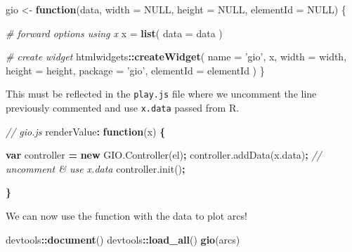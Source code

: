 \documentclass[10pt,]{krantz}
\makeatletter
\newenvironment{Shaded}{\begin{snugshade}}{\end{snugshade}}
\newcommand{\AttributeTok}[1]{\textcolor[rgb]{0.61,0.61,0.61}{#1}}
\newcommand{\CommentTok}[1]{\textcolor[rgb]{0.37,0.37,0.37}{\textit{#1}}}
\newcommand{\ControlFlowTok}[1]{\textcolor[rgb]{0.27,0.27,0.27}{\textbf{#1}}}
\newcommand{\DataTypeTok}[1]{\textcolor[rgb]{0.27,0.27,0.27}{#1}}
\newcommand{\KeywordTok}[1]{\textcolor[rgb]{0.27,0.27,0.27}{\textbf{#1}}}
\newcommand{\NormalTok}[1]{#1}
\newcommand{\OperatorTok}[1]{\textcolor[rgb]{0.43,0.43,0.43}{\textbf{#1}}}
\newcommand{\OtherTok}[1]{\textcolor[rgb]{0.37,0.37,0.37}{#1}}
\newcommand{\StringTok}[1]{\textcolor[rgb]{0.5,0.5,0.5}{#1}}
\newcommand{\VariableTok}[1]{\textcolor[rgb]{0,0,0}{#1}}
\newenvironment{kframe}{%
\medskip{}
\setlength{\fboxsep}{.8em}
 \def\at@end@of@kframe{}%
 \ifinner\ifhmode%
  \def\at@end@of@kframe{\end{minipage}}%
  \begin{minipage}{\columnwidth}%
 \fi\fi%
 \def\FrameCommand##1{\hskip\@totalleftmargin \hskip-\fboxsep
 \colorbox{shadecolor}{##1}\hskip-\fboxsep
     \hskip-\linewidth \hskip-\@totalleftmargin \hskip\columnwidth}%
 \MakeFramed {\advance\hsize-\width
   \@totalleftmargin\z@ \linewidth\hsize
   \@setminipage}}%
 {\par\unskip\endMakeFramed%
 \at@end@of@kframe}
\renewenvironment{Shaded}{\begin{kframe}}{\end{kframe}}
\makeatother
\begin{document}
\begin{Shaded}
\begin{Highlighting}[]
\NormalTok{gio <-}\StringTok{ }\ControlFlowTok{function}\NormalTok{(data, }\DataTypeTok{width =} \OtherTok{NULL}\NormalTok{, }\DataTypeTok{height =} \OtherTok{NULL}\NormalTok{, }\DataTypeTok{elementId =} \OtherTok{NULL}\NormalTok{) \{}

  \CommentTok{# forward options using x}
\NormalTok{  x =}\StringTok{ }\KeywordTok{list}\NormalTok{(}
    \DataTypeTok{data =}\NormalTok{ data}
\NormalTok{  )}

  \CommentTok{# create widget}
\NormalTok{  htmlwidgets}\OperatorTok{::}\KeywordTok{createWidget}\NormalTok{(}
    \DataTypeTok{name =} \StringTok{'gio'}\NormalTok{,}
\NormalTok{    x,}
    \DataTypeTok{width =}\NormalTok{ width,}
    \DataTypeTok{height =}\NormalTok{ height,}
    \DataTypeTok{package =} \StringTok{'gio'}\NormalTok{,}
    \DataTypeTok{elementId =}\NormalTok{ elementId}
\NormalTok{  )}
\NormalTok{\}}
\end{Highlighting}
\end{Shaded}

This must be reflected in the \texttt{play.js} file where we uncomment the line previously commented and use \texttt{x.data} passed from R.

\begin{Shaded}
\begin{Highlighting}[]
\CommentTok{// gio.js}
\NormalTok{renderValue}\OperatorTok{:} \KeywordTok{function}\NormalTok{(x) }\OperatorTok{\{}

  \KeywordTok{var}\NormalTok{ controller }\OperatorTok{=} \KeywordTok{new} \VariableTok{GIO}\NormalTok{.}\AttributeTok{Controller}\NormalTok{(el)}\OperatorTok{;}
  \VariableTok{controller}\NormalTok{.}\AttributeTok{addData}\NormalTok{(}\VariableTok{x}\NormalTok{.}\AttributeTok{data}\NormalTok{)}\OperatorTok{;} \CommentTok{// uncomment & use x.data}
  \VariableTok{controller}\NormalTok{.}\AttributeTok{init}\NormalTok{()}\OperatorTok{;}

\OperatorTok{\}}
\end{Highlighting}
\end{Shaded}

We can now use the function with the data to plot arcs!

\begin{Shaded}
\begin{Highlighting}[]
\NormalTok{devtools}\OperatorTok{::}\KeywordTok{document}\NormalTok{()}
\NormalTok{devtools}\OperatorTok{::}\KeywordTok{load_all}\NormalTok{()}
\KeywordTok{gio}\NormalTok{(arcs)}
\end{Highlighting}
\end{Shaded}
\end{document}
